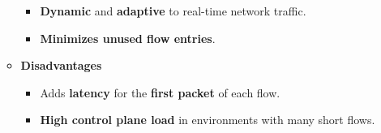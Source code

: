 \begin{itemize}
\begin{itemize}
\begin{itemize}[label=\textcolor{Green3}{}]
            \item \textbf{Dynamic} and \textbf{adaptive} to real-time network traffic.
            \item \textbf{Minimizes unused flow entries}.
        \end{itemize}
        \item[\textcolor{Red2}{\faIcon{times-circle}}] \textcolor{Red2}{\textbf{Disadvantages}}
        \begin{itemize}[label=\textcolor{Red2}{}]
            \item Adds \textbf{latency} for the \textbf{first packet} of each flow.
            \item \textbf{High control plane load} in environments with many short flows.
        \end{itemize}
    \end{itemize}


\end{itemize}
